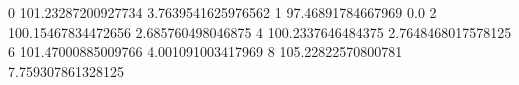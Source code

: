 0 101.23287200927734 3.7639541625976562
1 97.46891784667969 0.0
2 100.15467834472656 2.685760498046875
4 100.2337646484375 2.7648468017578125
6 101.47000885009766 4.001091003417969
8 105.22822570800781 7.759307861328125
